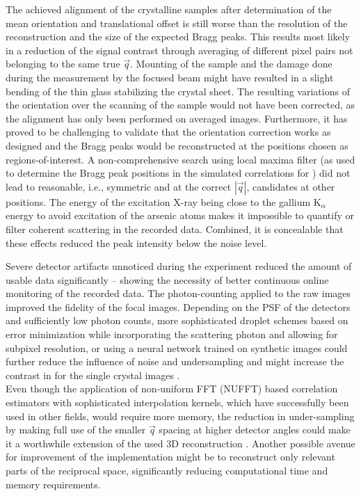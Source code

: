 The achieved alignment of the crystalline samples after determination of the mean orientation and translational offset is still worse than the resolution of the reconstruction and the size of the expected Bragg peaks. This results most likely in a reduction of the signal contrast through averaging of different pixel pairs not belonging to the same true $\vec{q}$. Mounting of the sample and the damage done during the measurement by the focused beam might have resulted in a slight bending of the thin glass stabilizing the crystal sheet. The resulting variations of the orientation over the scanning of the sample would not have been corrected, as the alignment has only been performed on averaged images.  Furthermore, it has proved to be challenging to validate that the orientation correction works as designed and the Bragg peaks would be reconstructed at the positions chosen as regions-of-interest. A non-comprehensive search using local maxima filter (as used to determine the Bragg peak positions in the simulated correlations for ) did not lead to reasonable, i.e., symmetric and at the correct $\left|\vec{q}\right|$, candidates at other positions.
The energy of the excitation X-ray being close to the gallium K$_\alpha$ energy to avoid excitation of the arsenic atoms makes it impossible to quantify or filter coherent scattering in the recorded data. Combined, it is concealable that these effects reduced the peak intensity below the noise level. 

Severe detector artifacts unnoticed during the experiment reduced the amount of usable data significantly -- showing the necessity of better continuous online monitoring of the recorded data. The photon-counting applied to the raw images improved the fidelity of the focal images. Depending on the PSF of the detectors and sufficiently low photon counts, more sophisticated droplet schemes based on error minimization while incorporating the scattering photon and allowing for subpixel resolution, or using a neural network trained on synthetic images could further reduce the influence of noise and undersampling and might increase the contrast in for the single crystal images \cite{baumann2018,collaboration2014,schayck2020,sun2020}.\\
Even though the application of non-uniform FFT (NUFFT) based correlation estimators with sophisticated interpolation kernels, which have successfully been used in other fields, would require more memory, the reduction in under-sampling by making full use of the smaller $\vec{q}$ spacing at higher detector angles could make it a worthwhile extension of the used 3D reconstruction \cite{laguna1998,yang2008,chang2020}. Another possible avenue for improvement of the implementation might be to reconstruct only relevant parts of the reciprocal space, significantly reducing computational time and memory requirements. 


